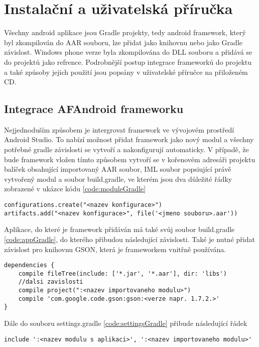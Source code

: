 \chapter{Instalační a uživatelská příručka}
Všechny android aplikace jsou Gradle projekty, tedy android framework, který byl zkompilován do AAR souboru, lze přidat jako knihovnu nebo jako Gradle závislost. Windows phone verze byla zkompilována do DLL souboru a přidává se do projektů jako refrence. Podrobnější postup integrace frameworků do projektu a také způsoby jejich použití jsou popsány v uživatelské příručce na přiloženém CD.

\section{Integrace AFAndroid frameworku}
Nejjednoduším způsobem je intergrovat framework ve vývojovém prostředí Android Studio. To nabízí možnost přidat framework jako nový modul a všechny potřebné gradle závislosti se vytvoří a nakonfigurují automaticky. V případě, že bude framework vložen tímto způsobem vytvoří se v kořenovém adresáři projektu balíček obsahující importovaný AAR soubor, IML soubor popsiující právě vytvořený modul a soubor build.gradle, ve kterém jsou dva důležité řádky zobrazené v ukázce kódu \ref{code:moduleGradle}
\begin{lstlisting}[caption={Gradle soubor pro build v balíčku s novým modulem},
label={code:moduleGradle}, basicstyle=\footnotesize, frame=single]
configurations.create("<nazev konfigurace>") 
artifacts.add("<nazev konfigurace>", file('<jmeno souboru>.aar'))
\end{lstlisting}

Aplikace, do které je framework přidáván má také svůj soubor build.gradle \ref{code:appGradle}, do kterého přibudou následující závislosti. Také je nutné přidat závislost pro knihovnu GSON, která je frameworkem vnitřně používána. 
\begin{lstlisting}[caption={Gradle soubor pro build aplikace, do které je framework integrován},
label={code:appGradle}, basicstyle=\footnotesize, frame=single]
dependencies {
	compile fileTree(include: ['*.jar', '*.aar'], dir: 'libs')  
	//dalsi zavislosti     
	compile project(":<nazev importovaneho modulu>") 
	compile 'com.google.code.gson:gson:<verze napr. 1.7.2.>'
} 
\end{lstlisting}

Dále do souboru settings.gradle \ref{code:settingsGradle} přibude následující řádek
\begin{lstlisting}[caption={Gradle soubor s nastaveními aplikace, do které je framework integrován },
label={code:settingsGradle}, basicstyle=\footnotesize, frame=single ]
include ':<nazev modulu s aplikaci>', ':<nazev importovaneho modulu>' 
\end{lstlisting}


